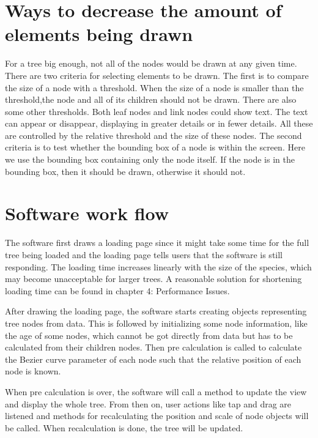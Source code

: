 \documentclass[MSc]{icldt}
\begin{document}
\section{Ways to decrease the amount of elements being drawn}

For a tree big enough, not all of the nodes would be drawn at any given time. There are two criteria for selecting elements to be drawn. The first is to compare the size of a node with a threshold. When the size of a node is smaller than the threshold,the node and all of its children should not be drawn. There are also some other thresholds. Both leaf nodes and link nodes could show text. The text can appear or disappear, displaying in greater details or in fewer details. All these are controlled by the relative threshold and the size of these nodes. The second criteria is to test whether the bounding box of a node is within the screen. Here we use the bounding box containing only the node itself. If the node is in the bounding box, then it should be drawn, otherwise it should not. 

\section{Software work flow}

The software first draws a loading page since it might take some time for the full tree being loaded and the loading page tells users that the software is still responding. The loading time increases linearly with the size of the species, which may become unacceptable for larger trees. A reasonable solution for shortening loading time can be found in chapter 4: Performance Issues. 

After drawing the loading page, the software starts creating objects representing tree nodes from data. This is followed by initializing some node information, like the age of some nodes, which cannot be got directly from data but has to be calculated from their children nodes. Then pre calculation is called to calculate the Bezier curve parameter of each node such that the relative position of each node is known. 

When pre calculation is over, the software will call a method to update the view and display the whole tree. From then on, user actions like tap and drag are listened and methods for recalculating the position and scale of node objects will be called. When recalculation is done, the tree will be updated. 
\end{document}
